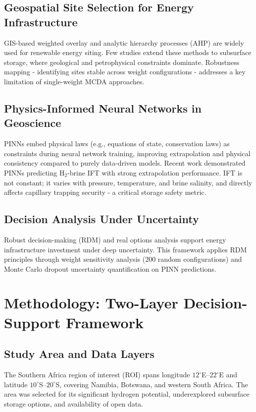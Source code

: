 \documentclass[11pt]{article}
\begin{document}
\subsection{Geospatial Site Selection for Energy Infrastructure}
GIS-based weighted overlay and analytic hierarchy processes (AHP) are widely used for renewable energy siting. Few studies extend these methods to subsurface storage, where geological and petrophysical constraints dominate. Robustness mapping - identifying sites stable across weight configurations - addresses a key limitation of single-weight MCDA approaches.

\subsection{Physics-Informed Neural Networks in Geoscience}
PINNs embed physical laws (e.g., equations of state, conservation laws) as constraints during neural network training, improving extrapolation and physical consistency compared to purely data-driven models. Recent work demonstrated PINNs predicting H$_2$-brine IFT with strong extrapolation performance. IFT is not constant; it varies with pressure, temperature, and brine salinity, and directly affects capillary trapping security - a critical storage safety metric.

\subsection{Decision Analysis Under Uncertainty}
Robust decision-making (RDM) and real options analysis support energy infrastructure investment under deep uncertainty. This framework applies RDM principles through weight sensitivity analysis (200 random configurations) and Monte Carlo dropout uncertainty quantification on PINN predictions.

\section{Methodology: Two-Layer Decision-Support Framework}

\subsection{Study Area and Data Layers}
The Southern Africa region of interest (ROI) spans longitude $12^\circ$E--$22^\circ$E and latitude $10^\circ$S--$20^\circ$S, covering Namibia, Botswana, and western South Africa. The area was selected for its significant hydrogen potential, underexplored subsurface storage options, and availability of open data.
\end{document}
